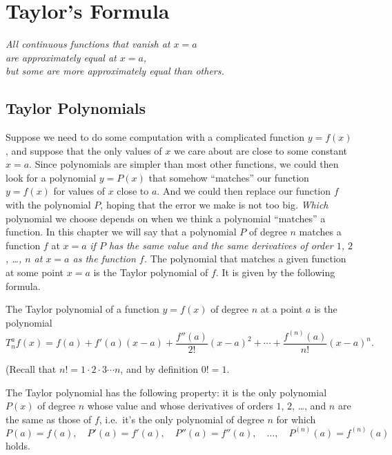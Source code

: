 \chapter{Taylor's Formula}%
\label{cha:taylor}

\vspace{.25in}
\begin{center}\color{badgerred}
  \itshape All continuous functions that vanish at $x=a$\\
  are approximately equal at $x=a$, \\
  but some are more approximately equal than others.
\end{center}
\vspace{0.25in}

\section{Taylor Polynomials} \label{sec:taylors-formula} Suppose we need to do %
some computation with a complicated function $y=f(x)$, and suppose that the only
values of $x$ we care about are close to some constant $x=a$.  Since polynomials
are simpler than most other functions, we could then look for a polynomial
$y=P(x)$ that somehow ``matches'' our function $y=f(x)$ for values of $x$ close
to $a$.  And we could then replace our function $f$ with the polynomial $P$,
hoping that the error we make is not too big.  \textit{Which} polynomial we 
choose depends on when we think a polynomial ``matches'' a function.  In this
chapter we will say that a polynomial $P$ of degree $n$ matches a function $f$
at $x=a$ \emph{if $P$ has the same value and the same derivatives of order $1$,
$2$, \ldots, $n$ at $x=a$ as the function $f$.}  The polynomial that matches a
given function at some point $x=a$ is the Taylor polynomial of $f$.  It is given
by the following formula.


\begin{definition}
  The Taylor polynomial of a function $y=f(x)$ of degree $n$ at a point $a$ is
  the polynomial
  \begin{equation}
    \label{eq:taylor-general}
    T_n^af (x) 
    = f (a) 
    +f' (a) (x-a)
    +\frac{f'' (a)}{2!} (x-a)^2 +\cdots 
    +\frac{f^{(n)} (a)}{n!} (x-a)^n.
  \end{equation}
\end{definition}
(Recall that $n! = 1\cdot2\cdot3\cdots n$, and by definition $0!=1$.
\begin{theorem}\label{thm:taylor-of-polynomial}
  The Taylor polynomial has the following property: it is the only polynomial
  $P(x)$ of degree $n$ whose value and whose derivatives of orders $1$, $2$,
  \ldots, and $n$ are the same as those of $f$, i.e.\ it's the only polynomial
  of degree $n$ for which
  \[
  P(a)=f (a), \quad P' (a)=f' (a), \quad P'' (a)=f'' (a),\quad \ldots,\quad
  P^{(n)} (a) = f^{(n)} (a)
  \]
  holds.
\end{theorem}

